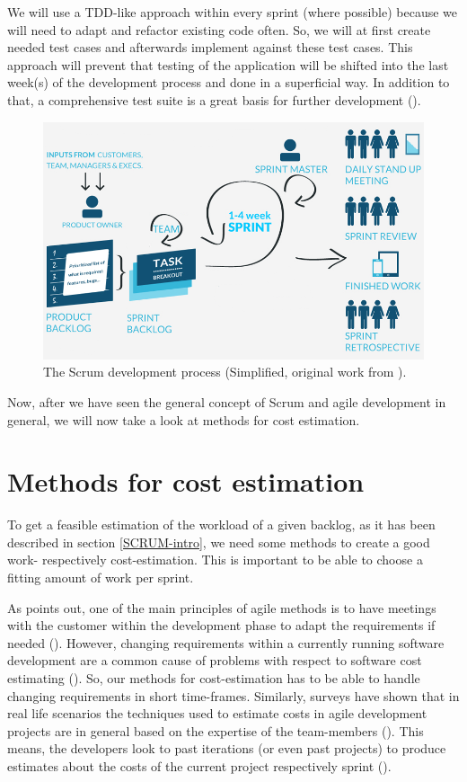 We will use a \ac{TDD}-like approach within every sprint (where possible) because we will need to adapt and refactor existing code often. So, we will at first create needed test cases and afterwards implement against these test cases. This approach will prevent that testing of the application will be shifted into the last week(s) of the development process and done in a superficial way. In addition to that, a comprehensive test suite is a great basis for further development (\cite{max03}).

\begin{figure}[th]
\centerline{\includegraphics[width=1\textwidth]{gfx/scrum}}
\caption{The Scrum development process (Simplified, original work from \cite{5_maxxor.com_2015}).}
\label{ScrumDia}
\end{figure}

Now, after we have seen the general concept of Scrum and agile development in general, we will now take a look at methods for cost estimation. 

\section{Methods for cost estimation}
\label{cost}
To get a feasible estimation of the workload of a given backlog, as it has been described in section \ref{SCRUM-intro}, we need some methods to create a good work- respectively cost-estimation. This is important to be able to choose a fitting amount of work per sprint.

As \cite{Keaveney11} points out, one of the main principles of agile methods is to have meetings with the customer within the development phase to adapt the requirements if needed (\cite{Beck2001agile}). However, changing requirements within a currently running software development are a common cause of problems with respect to software cost estimating (\cite{jones2003flawed}). So, our methods for cost-estimation has to be able to handle changing requirements in short time-frames. Similarly, surveys have shown that in real life scenarios the techniques used to estimate costs in agile development projects are in general based on the expertise of the team-members (\cite{ceschi2005project}). This means, the developers look to past iterations (or even past projects) to produce estimates about the costs of the current project respectively sprint (\cite{ceschi2005project}). 


